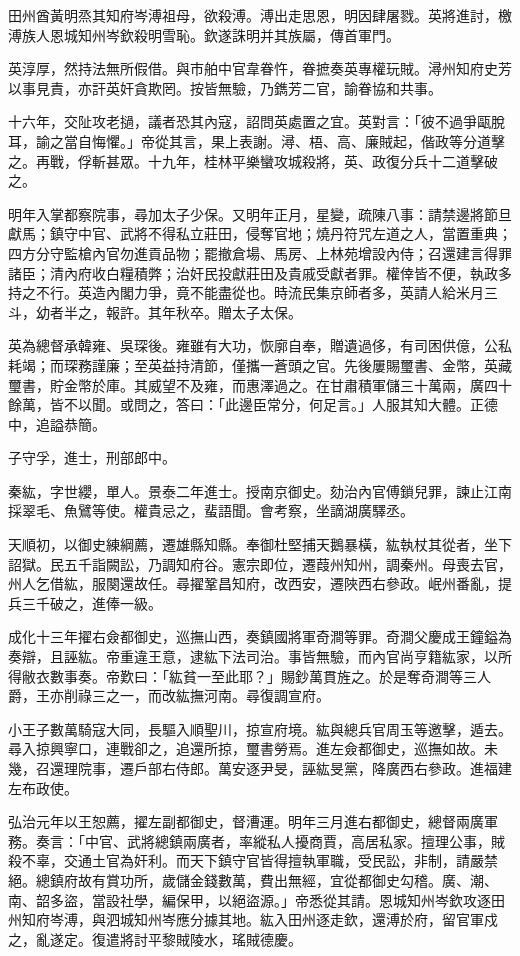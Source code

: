 \begin{pinyinscope}
田州酋黃明烝其知府岑溥祖母，欲殺溥。溥出走思恩，明因肆屠戮。英將進討，檄溥族人恩城知州岑欽殺明雪恥。欽遂誅明并其族屬，傳首軍門。

英淳厚，然持法無所假借。與市舶中官韋眷忤，眷摭奏英專權玩賊。潯州知府史芳以事見責，亦訐英奸貪欺罔。按皆無驗，乃鐫芳二官，諭眷協和共事。

十六年，交阯攻老撾，議者恐其內寇，詔問英處置之宜。英對言：「彼不過爭甌脫耳，諭之當自悔懼。」帝從其言，果上表謝。潯、梧、高、廉賊起，偕政等分道擊之。再戰，俘斬甚眾。十九年，桂林平樂蠻攻城殺將，英、政復分兵十二道擊破之。

明年入掌都察院事，尋加太子少保。又明年正月，星變，疏陳八事：請禁邊將節旦獻馬；鎮守中官、武將不得私立莊田，侵奪官地；燒丹符咒左道之人，當置重典；四方分守監槍內官勿進貢品物；罷撤倉場、馬房、上林苑增設內侍；召還建言得罪諸臣；清內府收白糧積弊；治奸民投獻莊田及貴戚受獻者罪。權倖皆不便，執政多持之不行。英造內閣力爭，竟不能盡從也。時流民集京師者多，英請人給米月三斗，幼者半之，報許。其年秋卒。贈太子太保。

英為總督承韓雍、吳琛後。雍雖有大功，恢廓自奉，贈遺過侈，有司困供億，公私耗竭；而琛務謹廉；至英益持清節，僅攜一蒼頭之官。先後屢賜璽書、金幣，英藏璽書，貯金幣於庫。其威望不及雍，而惠澤過之。在甘肅積軍儲三十萬兩，廣四十餘萬，皆不以聞。或問之，答曰：「此邊臣常分，何足言。」人服其知大體。正德中，追謚恭簡。

子守孚，進士，刑部郎中。

秦紘，字世纓，單人。景泰二年進士。授南京御史。劾治內官傅鎖兒罪，諫止江南採翠毛、魚鷿等使。權貴忌之，蜚語聞。會考察，坐謫湖廣驛丞。

天順初，以御史練綱薦，遷雄縣知縣。奉御杜堅捕天鵝暴橫，紘執杖其從者，坐下詔獄。民五千詣闕訟，乃調知府谷。憲宗即位，遷葭州知州，調秦州。母喪去官，州人乞借紘，服闋還故任。尋擢鞏昌知府，改西安，遷陜西右參政。岷州番亂，提兵三千破之，進俸一級。

成化十三年擢右僉都御史，巡撫山西，奏鎮國將軍奇澗等罪。奇澗父慶成王鐘鎰為奏辯，且誣紘。帝重違王意，逮紘下法司治。事皆無驗，而內官尚亨籍紘家，以所得敝衣數事奏。帝歎曰：「紘貧一至此耶？」賜鈔萬貫旌之。於是奪奇澗等三人爵，王亦削祿三之一，而改紘撫河南。尋復調宣府。

小王子數萬騎寇大同，長驅入順聖川，掠宣府境。紘與總兵官周玉等邀擊，遁去。尋入掠興寧口，連戰卻之，追還所掠，璽書勞焉。進左僉都御史，巡撫如故。未幾，召還理院事，遷戶部右侍郎。萬安逐尹旻，誣紘旻黨，降廣西右參政。進福建左布政使。

弘治元年以王恕薦，擢左副都御史，督漕運。明年三月進右都御史，總督兩廣軍務。奏言：「中官、武將總鎮兩廣者，率縱私人擾商賈，高居私家。擅理公事，賊殺不辜，交通土官為奸利。而天下鎮守官皆得擅執軍職，受民訟，非制，請嚴禁絕。總鎮府故有賞功所，歲儲金錢數萬，費出無經，宜從都御史勾稽。廣、潮、南、韶多盜，當設社學，編保甲，以絕盜源。」帝悉從其請。恩城知州岑欽攻逐田州知府岑溥，與泗城知州岑應分據其地。紘入田州逐走欽，還溥於府，留官軍戍之，亂遂定。復遣將討平黎賊陵水，瑤賊德慶。


\end{pinyinscope}

